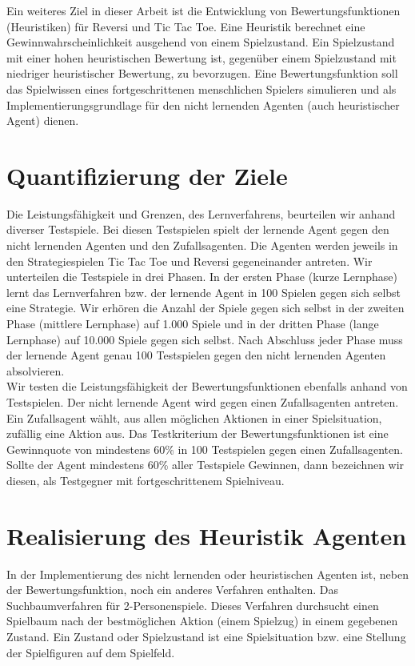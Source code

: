 Ein weiteres Ziel in dieser Arbeit ist die Entwicklung von Bewertungsfunktionen (Heuristiken) für Reversi und Tic Tac Toe. Eine Heuristik berechnet eine Gewinnwahrscheinlichkeit ausgehend von einem Spielzustand. Ein Spielzustand mit einer hohen heuristischen Bewertung ist, gegenüber einem Spielzustand mit niedriger heuristischer Bewertung, zu bevorzugen. Eine Bewertungsfunktion soll das Spielwissen eines fortgeschrittenen menschlichen Spielers simulieren und als Implementierungsgrundlage für den nicht lernenden Agenten (auch heuristischer Agent) dienen.\\

\section{Quantifizierung der Ziele}
Die Leistungsfähigkeit und Grenzen, des Lernverfahrens, beurteilen wir anhand diverser Testspiele. Bei diesen Testspielen spielt der lernende Agent gegen den nicht lernenden Agenten und den Zufallsagenten. Die Agenten werden jeweils in den Strategiespielen Tic Tac Toe und Reversi gegeneinander antreten. Wir unterteilen die Testspiele in drei Phasen. In der ersten Phase (kurze Lernphase) lernt das Lernverfahren bzw. der lernende Agent in 100 Spielen gegen sich selbst eine Strategie. Wir erhören die Anzahl der Spiele gegen sich selbst in der zweiten Phase (mittlere Lernphase) auf 1.000 Spiele und in der dritten Phase (lange Lernphase) auf 10.000 Spiele gegen sich selbst. Nach Abschluss jeder Phase muss der lernende Agent genau 100 Testspielen gegen den nicht lernenden Agenten absolvieren. \\

Wir testen die Leistungsfähigkeit der Bewertungsfunktionen ebenfalls anhand von Testspielen. Der nicht lernende Agent wird gegen einen Zufallsagenten antreten. Ein Zufallsagent wählt, aus allen möglichen Aktionen in einer Spielsituation, zufällig eine Aktion aus. Das Testkriterium der Bewertungsfunktionen ist eine Gewinnquote von mindestens 60\% in 100 Testspielen gegen einen Zufallsagenten. Sollte der Agent mindestens 60\% aller Testspiele Gewinnen, dann bezeichnen wir diesen, als Testgegner mit fortgeschrittenem Spielniveau. \\

\section{Realisierung des Heuristik Agenten}
In der Implementierung des nicht lernenden oder heuristischen Agenten ist, neben der Bewertungsfunktion, noch ein anderes Verfahren enthalten. Das Suchbaumverfahren für 2-Personenspiele. Dieses Verfahren durchsucht einen Spielbaum nach der bestmöglichen Aktion (einem Spielzug) in einem gegebenen Zustand. Ein Zustand oder Spielzustand ist eine Spielsituation bzw. eine Stellung der Spielfiguren auf dem Spielfeld. \\


